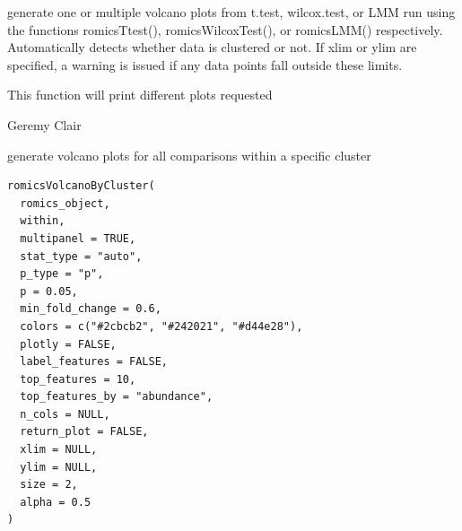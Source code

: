 \documentclass[a4paper]{book}
\begin{document}
%
\begin{Details}
generate one or multiple volcano plots from t.test, wilcox.test, or LMM run using the functions romicsTtest(), romicsWilcoxTest(), or romicsLMM() respectively. Automatically detects whether data is clustered or not. If xlim or ylim are specified, a warning is issued if any data points fall outside these limits.
\end{Details}
%
\begin{Value}
This function will print different plots requested
\end{Value}
%
\begin{Author}
Geremy Clair
\end{Author}
%
\begin{Description}
generate volcano plots for all comparisons within a specific cluster
\end{Description}
%
\begin{Usage}
\begin{verbatim}
romicsVolcanoByCluster(
  romics_object,
  within,
  multipanel = TRUE,
  stat_type = "auto",
  p_type = "p",
  p = 0.05,
  min_fold_change = 0.6,
  colors = c("#2cbcb2", "#242021", "#d44e28"),
  plotly = FALSE,
  label_features = FALSE,
  top_features = 10,
  top_features_by = "abundance",
  n_cols = NULL,
  return_plot = FALSE,
  xlim = NULL,
  ylim = NULL,
  size = 2,
  alpha = 0.5
)
\end{verbatim}
\end{Usage}
%
\end{document}
